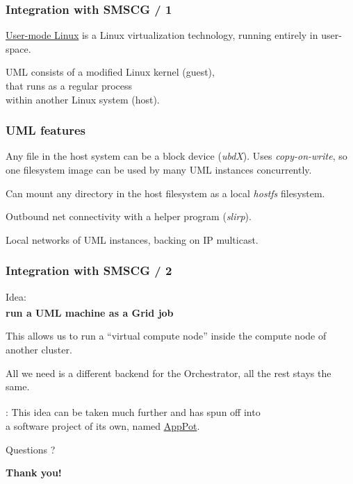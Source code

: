 \documentclass[english,serif,mathserif,xcolor=pdftex,dvipsnames,table]{beamer}
\begin{document}
\begin{frame}[label=UML]
  \frametitle{Integration with SMSCG / 1}
  \begin{center}
    \href{http://user-mode-linux.sf.net}{User-mode Linux} 
    is a Linux virtualization technology, running entirely in user-space.

    \+
    UML consists of a modified Linux kernel (guest), \\
    that runs as a regular process \\ within another Linux system (host).
  \end{center}
\end{frame}


\begin{frame}
  \frametitle{UML features}
  \label{sec:7}
  Any file in the host system can be a block device (\emph{ubdX}).
  Uses \emph{copy-on-write}, so one filesystem image can be used by many
  UML instances concurrently.

  \+
  Can mount any directory in the host filesystem as a local
  \emph{hostfs} filesystem.
  
  \+
  Outbound net connectivity with a helper program (\emph{slirp}).
  
  \+
  Local networks of UML instances, backing on IP multicast.
\end{frame}


\begin{frame}[label=smscg2]
  \frametitle{Integration with SMSCG / 2}
  \begin{center}
    Idea: \\ \textbf{run a UML machine as a Grid job\textsuperscript{\dag}}

    \+ 
    This allows us to run a ``virtual compute node'' inside the
    compute node of another cluster.

    \+ 
    All we need is a different backend for the Orchestrator, all
    the rest stays the same.

    \+\+
    {\scriptsize \textsuperscript{\dag}: 
      This idea can be taken much further and has spun off into \\
      a software project of its own, named \hyperlink{AppPot}{AppPot}.}
  \end{center}
\end{frame}


\begin{frame}
\begin{center}
  {\Huge Questions ?}

  \+\+
  {\large \bf Thank you!}
\end{center}
\end{frame}
\end{document}
